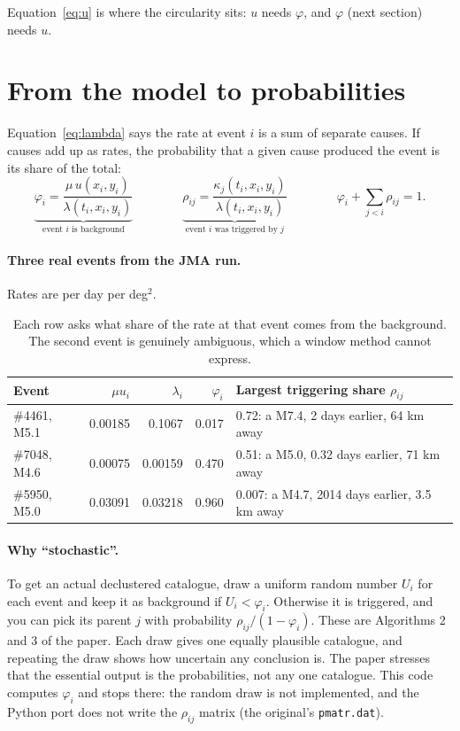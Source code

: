 \documentclass[11pt,a4paper]{article}
\newcommand{\code}[1]{\texttt{#1}}
\begin{document}
Equation~\eqref{eq:u} is where the circularity sits: $u$ needs $\varphi$, and
$\varphi$ (next section) needs $u$.

\section{From the model to probabilities}

Equation~\eqref{eq:lambda} says the rate at event $i$ is a sum of separate causes. If causes add
up as rates, the probability that a given cause produced the event is its share of the total:
\begin{equation}
  \underbrace{\varphi_i = \frac{\mu\,u(x_i,y_i)}{\lambda(t_i,x_i,y_i)}}_{\text{event $i$ is background}}
  \qquad\qquad
  \underbrace{\rho_{ij} = \frac{\kappa_j(t_i,x_i,y_i)}{\lambda(t_i,x_i,y_i)}}_{\text{event $i$ was triggered by $j$}}
  \qquad\qquad
  \varphi_i + \sum_{j<i}\rho_{ij} = 1.
  \label{eq:phi}
\end{equation}

\paragraph{Three real events from the JMA run.} Rates are per day per deg$^2$.

\begin{table}[H]
\centering\small
\begin{tabular}{@{}lrrrl@{}}
\toprule
Event & $\mu u_i$ & $\lambda_i$ & $\varphi_i$ & Largest triggering share $\rho_{ij}$ \\
\midrule
\#4461, M5.1 & 0.00185 & 0.1067 & 0.017 & 0.72: a M7.4, 2 days earlier, 64 km away \\
\#7048, M4.6 & 0.00075 & 0.00159 & 0.470 & 0.51: a M5.0, 0.32 days earlier, 71 km away \\
\#5950, M5.0 & 0.03091 & 0.03218 & 0.960 & 0.007: a M4.7, 2014 days earlier, 3.5 km away \\
\bottomrule
\end{tabular}
\caption{Each row asks what share of the rate at that event comes from the background. The second
event is genuinely ambiguous, which a window method cannot express.}
\label{tab:events}
\end{table}

\paragraph{Why ``stochastic''.}
To get an actual declustered catalogue, draw a uniform random number $U_i$ for each event and keep
it as background if $U_i<\varphi_i$. Otherwise it is triggered, and you can pick its parent $j$ with
probability $\rho_{ij}/(1-\varphi_i)$. These are Algorithms 2 and 3 of the paper. Each draw gives
one equally plausible catalogue, and repeating the draw shows how uncertain any conclusion is. The
paper stresses that the essential output is the probabilities, not any one catalogue. This code
computes $\varphi_i$ and stops there: the random draw is not implemented, and the Python port does
not write the $\rho_{ij}$ matrix (the original's \code{pmatr.dat}).
\end{document}
